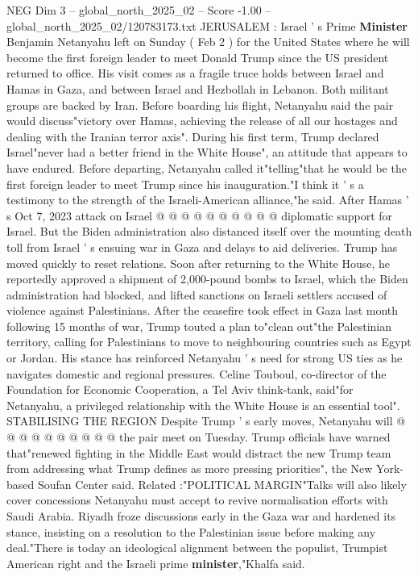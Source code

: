 \begin{textsample}{NEG Dim 3 – global\_north\_2025\_02 – Score -1.00 – global\_north\_2025\_02/120783173.txt}  \label{ex:f3_neg_164}
JERUSALEM : Israel ' s Prime \textbf{Minister} Benjamin Netanyahu left on Sunday ( Feb 2 ) for the United States where he will become the first foreign leader to meet Donald Trump since the US president returned to office.
His visit comes as a fragile truce holds between Israel and Hamas in Gaza, and between Israel and Hezbollah in Lebanon.
Both militant groups are backed by Iran.
Before boarding his flight, Netanyahu said the pair would discuss"victory over Hamas, achieving the release of all our hostages and dealing with the Iranian terror axis".
During his first term, Trump declared Israel"never had a better friend in the White House", an attitude that appears to have endured.
Before departing, Netanyahu called it"telling"that he would be the first foreign leader to meet Trump since his inauguration."I think it ' s a testimony to the strength of the Israeli-American alliance,"he said.
After Hamas ' s Oct 7, 2023 attack on Israel @ @ @ @ @ @ @ @ @ @ diplomatic support for Israel.
But the Biden administration also distanced itself over the mounting death toll from Israel ' s ensuing war in Gaza and delays to aid deliveries.
Trump has moved quickly to reset relations.
Soon after returning to the White House, he reportedly approved a shipment of 2,000-pound bombs to Israel, which the Biden administration had blocked, and lifted sanctions on Israeli settlers accused of violence against Palestinians.
After the ceasefire took effect in Gaza last month following 15 months of war, Trump touted a plan to"clean out"the Palestinian territory, calling for Palestinians to move to neighbouring countries such as Egypt or Jordan.
His stance has reinforced Netanyahu ' s need for strong US ties as he navigates domestic and regional pressures.
Celine Touboul, co-director of the Foundation for Economic Cooperation, a Tel Aviv think-tank, said"for Netanyahu, a privileged relationship with the White House is an essential tool".
STABILISING THE REGION Despite Trump ' s early moves, Netanyahu will @ @ @ @ @ @ @ @ @ @ the pair meet on Tuesday.
Trump officials have warned that"renewed fighting in the Middle East would distract the new Trump team from addressing what Trump defines as more pressing priorities", the New York-based Soufan Center said.
Related :"POLITICAL MARGIN"Talks will also likely cover concessions Netanyahu must accept to revive normalisation efforts with Saudi Arabia.
Riyadh froze discussions early in the Gaza war and hardened its stance, insisting on a resolution to the Palestinian issue before making any deal."There is today an ideological alignment between the populist, Trumpist American right and the Israeli prime \textbf{minister},"Khalfa said.

\end{textsample}
